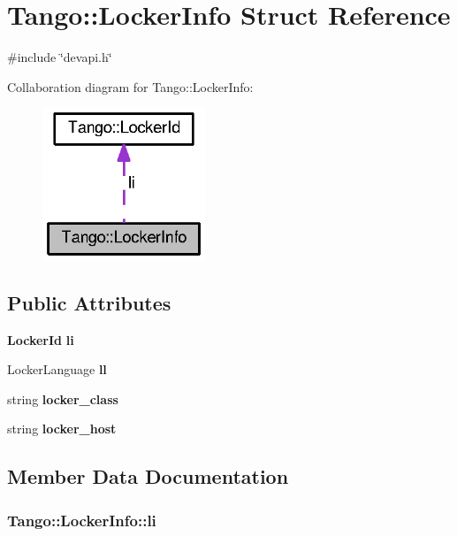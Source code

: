 \section{Tango\-:\-:Locker\-Info Struct Reference}
\label{structTango_1_1LockerInfo}


{\ttfamily \#include \char`\"{}devapi.\-h\char`\"{}}



Collaboration diagram for Tango\-:\-:Locker\-Info\-:
\nopagebreak
\begin{figure}[H]
\begin{center}
\leavevmode
\includegraphics[width=138pt]{dc/df0/structTango_1_1LockerInfo__coll__graph}
\end{center}
\end{figure}
\subsection*{Public Attributes}
\begin{DoxyCompactItemize}
\item 
{\bf Locker\-Id} {\bf li}
\item 
Locker\-Language {\bf ll}
\item 
string {\bf locker\-\_\-class}
\item 
string {\bf locker\-\_\-host}
\end{DoxyCompactItemize}


\subsection{Member Data Documentation}
\subsubsection[{li}]{ Tango\-::\-Locker\-Info\-::li}\label{structTango_1_1LockerInfo_ac19a902ad6cc0fe15e74485cc09d3f5a}

